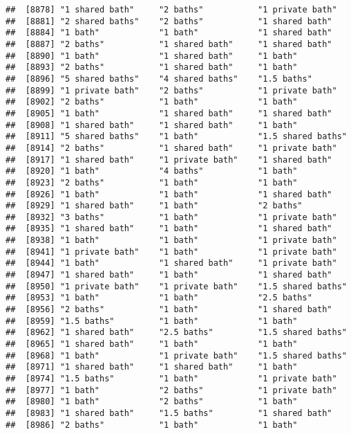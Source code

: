 \documentclass[
]{article}
\begin{document}
\begin{verbatim}
##  [8878] "1 shared bath"     "2 baths"           "1 private bath"   
##  [8881] "2 shared baths"    "2 baths"           "1 shared bath"    
##  [8884] "1 bath"            "1 bath"            "1 shared bath"    
##  [8887] "2 baths"           "1 shared bath"     "1 shared bath"    
##  [8890] "1 bath"            "1 shared bath"     "1 bath"           
##  [8893] "2 baths"           "1 shared bath"     "1 bath"           
##  [8896] "5 shared baths"    "4 shared baths"    "1.5 baths"        
##  [8899] "1 private bath"    "2 baths"           "1 private bath"   
##  [8902] "2 baths"           "1 bath"            "1 bath"           
##  [8905] "1 bath"            "1 shared bath"     "1 shared bath"    
##  [8908] "1 shared bath"     "1 shared bath"     "1 bath"           
##  [8911] "5 shared baths"    "1 bath"            "1.5 shared baths" 
##  [8914] "2 baths"           "1 shared bath"     "1 private bath"   
##  [8917] "1 shared bath"     "1 private bath"    "1 shared bath"    
##  [8920] "1 bath"            "4 baths"           "1 bath"           
##  [8923] "2 baths"           "1 bath"            "1 bath"           
##  [8926] "1 bath"            "1 bath"            "1 shared bath"    
##  [8929] "1 shared bath"     "1 bath"            "2 baths"          
##  [8932] "3 baths"           "1 bath"            "1 private bath"   
##  [8935] "1 shared bath"     "1 bath"            "1 shared bath"    
##  [8938] "1 bath"            "1 bath"            "1 private bath"   
##  [8941] "1 private bath"    "1 bath"            "1 private bath"   
##  [8944] "1 bath"            "1 shared bath"     "1 private bath"   
##  [8947] "1 shared bath"     "1 bath"            "1 shared bath"    
##  [8950] "1 private bath"    "1 private bath"    "1.5 shared baths" 
##  [8953] "1 bath"            "1 bath"            "2.5 baths"        
##  [8956] "2 baths"           "1 bath"            "1 shared bath"    
##  [8959] "1.5 baths"         "1 bath"            "1 bath"           
##  [8962] "1 shared bath"     "2.5 baths"         "1.5 shared baths" 
##  [8965] "1 shared bath"     "1 bath"            "1 bath"           
##  [8968] "1 bath"            "1 private bath"    "1.5 shared baths" 
##  [8971] "1 shared bath"     "1 shared bath"     "1 bath"           
##  [8974] "1.5 baths"         "1 bath"            "1 private bath"   
##  [8977] "1 bath"            "2 baths"           "1 private bath"   
##  [8980] "1 bath"            "2 baths"           "1 bath"           
##  [8983] "1 shared bath"     "1.5 baths"         "1 shared bath"    
##  [8986] "2 baths"           "1 bath"            "1 bath"           

\end{verbatim}
\end{document}
